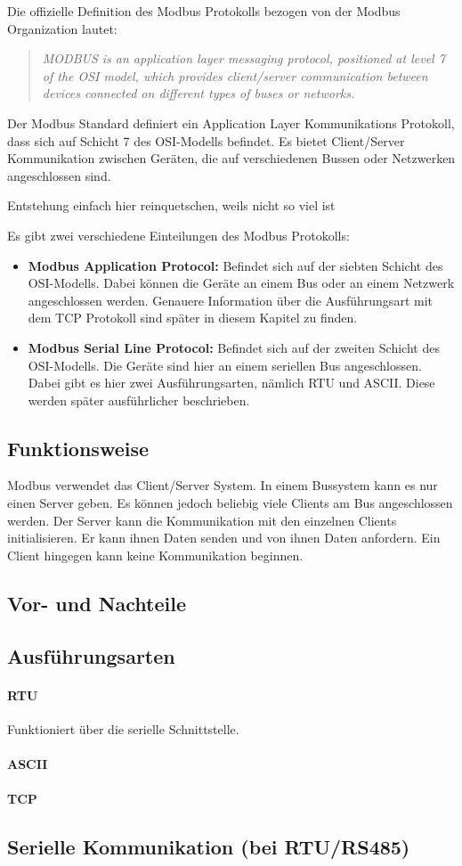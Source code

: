 Die offizielle Definition des Modbus Protokolls bezogen von der Modbus Organization \cite{Modbus_Organization_AP:2012} lautet:
\begin{quotation}
	\emph{
		MODBUS is an application layer messaging protocol, positioned at level 7 of the OSI model, which provides client/server communication between devices connected on different types of buses or networks.}
\end{quotation}

Der Modbus Standard definiert ein Application Layer Kommunikations Protokoll, dass sich auf Schicht 7 des OSI-Modells befindet. Es bietet Client/Server Kommunikation zwischen Geräten, die auf verschiedenen Bussen oder Netzwerken angeschlossen sind.

Entstehung einfach hier reinquetschen, weils nicht so viel ist

Es gibt zwei verschiedene Einteilungen des Modbus Protokolls: 
\begin{itemize}
\item \textbf{Modbus Application Protocol:} Befindet sich auf der siebten Schicht des OSI-Modells. Dabei können die Geräte an einem Bus oder an einem Netzwerk angeschlossen werden. Genauere Information über die Ausführungsart mit dem TCP Protokoll sind später in diesem Kapitel zu finden.
\item \textbf{Modbus Serial Line Protocol:} Befindet sich auf der zweiten Schicht des OSI-Modells. Die Geräte sind hier an einem seriellen Bus angeschlossen. Dabei gibt es hier zwei Ausführungsarten, nämlich RTU und ASCII. Diese werden später ausführlicher beschrieben.
\end{itemize}
\cite{Modbus_Organization_AP:2012}
\cite{Modbus_Organization_SL:2012}

\subsection{Funktionsweise}
Modbus verwendet das Client/Server System. In einem Bussystem kann es nur einen Server geben. Es können jedoch beliebig viele Clients am Bus angeschlossen werden. Der Server kann die Kommunikation mit den einzelnen Clients initialisieren. Er kann ihnen Daten senden und von ihnen Daten anfordern. Ein Client hingegen kann keine Kommunikation beginnen.

\subsection{Vor- und Nachteile}


\subsection{Ausführungsarten}
\paragraph{RTU}
Funktioniert über die serielle Schnittstelle.
\paragraph{ASCII}
\paragraph{TCP}

\subsection{Serielle Kommunikation (bei RTU/RS485)}


